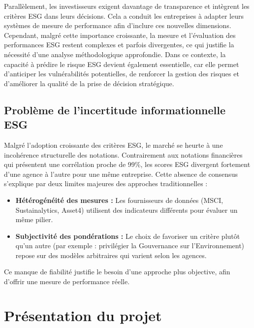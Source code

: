 Parallèlement, les investisseurs exigent davantage de transparence et intègrent les
critères ESG dans leurs décisions. Cela a conduit les entreprises à adapter leurs
systèmes de mesure de performance afin d'inclure ces nouvelles dimensions. 
\cite{dougan2025credit}
\newline
Cependant,
malgré cette importance croissante, la mesure et l'évaluation des performances ESG
restent complexes et parfois divergentes, ce qui justifie la nécessité d'une analyse
méthodologique approfondie. Dans ce contexte, la capacité à prédire le risque ESG
devient également essentielle, car elle permet d'anticiper les vulnérabilités potentielles,
de renforcer la gestion des risques et d'améliorer la qualité de la prise de décision
stratégique.

\subsection{Problème de l'incertitude informationnelle ESG}

Malgré l'adoption croissante des critères ESG, le marché se heurte à une incohérence structurelle des notations. Contrairement aux notations financières qui présentent une corrélation proche de 99\%, les scores ESG divergent fortement d'une agence à l'autre pour une même entreprise.
\cite{berg2020esg}\newline
Cette absence de consensus s'explique par deux limites majeures des approches traditionnelles :

\begin{itemize}
    \item \textbf{Hétérogénéité des mesures :} Les fournisseurs de données (MSCI, Sustainalytics, Asset4) utilisent des indicateurs différents pour évaluer un même pilier.
    
    \item \textbf{Subjectivité des pondérations :} Le choix de favoriser un critère plutôt qu'un autre (par exemple : privilégier la Gouvernance sur l'Environnement) repose sur des modèles arbitraires qui varient selon les agences.
\end{itemize}

Ce manque de fiabilité justifie le besoin d'une approche plus objective, afin d’offrir une mesure de performance réelle.



\section{Présentation du projet}
\label{sec:presentation_projet}

